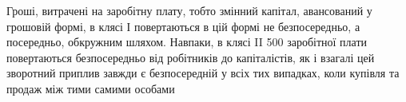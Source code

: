 \vtyagnut{}
Гроші, витрачені на заробітну плату, тобто змінний капітал, авансований
у грошовій формі, в клясі І повертаються в цій формі не безпосередньо,
а посередньо, обкружним шляхом. Навпаки, в клясі II 500 заробітної плати повертаються безпосередньо від робітників до
капіталістів, як і взагалі цей зворотний приплив завжди є безпосередній
у всіх тих випадках, коли купівля та продаж між тими самими особами
\parbreak{}  %
